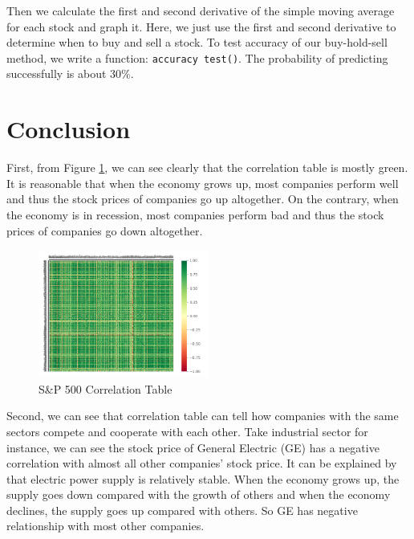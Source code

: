 \documentclass{article}
\begin{document}
        Then we calculate the first and second derivative of the simple moving average for each stock and graph it. Here, we just use the first and second derivative to determine when to buy and sell a stock. To test accuracy of our buy-hold-sell method, we write a function: \verb!accuracy test()!. The probability of predicting successfully is about 30\%.
    
    \section{Conclusion}
    First, from Figure \ref{fig1}, we can see clearly that the correlation table is mostly green. It is reasonable that when the economy grows up, most companies perform well and thus the stock prices of companies go up altogether. On the contrary, when the economy is in recession, most companies perform bad and thus the stock prices of companies go down altogether.
   
    \begin{figure}[H]
        \centering
        \includegraphics[width = 0.5\textwidth]{./1.png}
        \caption{S\&P 500 Correlation Table}
        \label{fig1}
    \end{figure}

    Second, we can see that correlation table can tell how companies with the same sectors compete and cooperate with each other. Take industrial sector for instance, we can see the stock price of General Electric (GE) has a negative correlation with almost all other companies' stock price. It can be explained by that electric power supply is relatively stable. When the economy grows up, the supply goes down compared with the growth of others and when the economy declines, the supply goes up compared with others. So GE has negative relationship with most other companies.
\end{document}
